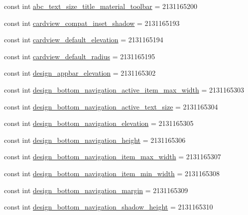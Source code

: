 \begin{CompactItemize}
\item 
const int \hyperlink{class__2doo_1_1_droid_1_1_resource_1_1_dimension_a3b4802cfe6800496e4190de71dedd84}{abc\_\-text\_\-size\_\-title\_\-material\_\-toolbar} = 2131165200
\item 
const int \hyperlink{class__2doo_1_1_droid_1_1_resource_1_1_dimension_439bc7a5dac4a4c6a13cf77485d380e8}{cardview\_\-compat\_\-inset\_\-shadow} = 2131165193
\item 
const int \hyperlink{class__2doo_1_1_droid_1_1_resource_1_1_dimension_a5b36f11266e50aba9d3c58bb16f9115}{cardview\_\-default\_\-elevation} = 2131165194
\item 
const int \hyperlink{class__2doo_1_1_droid_1_1_resource_1_1_dimension_f8ecf8752e155135de47172572a6975c}{cardview\_\-default\_\-radius} = 2131165195
\item 
const int \hyperlink{class__2doo_1_1_droid_1_1_resource_1_1_dimension_3cf56f111a6aa4e9e4672f9c48645011}{design\_\-appbar\_\-elevation} = 2131165302
\item 
const int \hyperlink{class__2doo_1_1_droid_1_1_resource_1_1_dimension_60113dd05a6a6d70c55284fb9b3f3094}{design\_\-bottom\_\-navigation\_\-active\_\-item\_\-max\_\-width} = 2131165303
\item 
const int \hyperlink{class__2doo_1_1_droid_1_1_resource_1_1_dimension_7825379733c9cb3ed2a4626e3ea6de2e}{design\_\-bottom\_\-navigation\_\-active\_\-text\_\-size} = 2131165304
\item 
const int \hyperlink{class__2doo_1_1_droid_1_1_resource_1_1_dimension_ebe6c14edce69e0320e71fe65999060e}{design\_\-bottom\_\-navigation\_\-elevation} = 2131165305
\item 
const int \hyperlink{class__2doo_1_1_droid_1_1_resource_1_1_dimension_b5226d29197d0ee71d9a47ad10af3908}{design\_\-bottom\_\-navigation\_\-height} = 2131165306
\item 
const int \hyperlink{class__2doo_1_1_droid_1_1_resource_1_1_dimension_49c14d9abc13b6a4cea63671c01b73d6}{design\_\-bottom\_\-navigation\_\-item\_\-max\_\-width} = 2131165307
\item 
const int \hyperlink{class__2doo_1_1_droid_1_1_resource_1_1_dimension_a2338aa8ccda6f8dfce18accf45b0b4f}{design\_\-bottom\_\-navigation\_\-item\_\-min\_\-width} = 2131165308
\item 
const int \hyperlink{class__2doo_1_1_droid_1_1_resource_1_1_dimension_b1eac0e4136dcd92b9d421ef64a2c696}{design\_\-bottom\_\-navigation\_\-margin} = 2131165309
\item 
const int \hyperlink{class__2doo_1_1_droid_1_1_resource_1_1_dimension_4f601ae632c2aa950be82cc91f95eba5}{design\_\-bottom\_\-navigation\_\-shadow\_\-height} = 2131165310

\end{CompactItemize}
